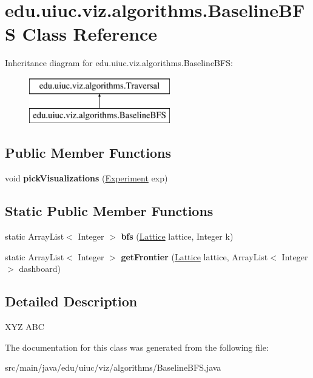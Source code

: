 \hypertarget{classedu_1_1uiuc_1_1viz_1_1algorithms_1_1_baseline_b_f_s}{}\section{edu.\+uiuc.\+viz.\+algorithms.\+Baseline\+B\+FS Class Reference}
\label{classedu_1_1uiuc_1_1viz_1_1algorithms_1_1_baseline_b_f_s}
Inheritance diagram for edu.\+uiuc.\+viz.\+algorithms.\+Baseline\+B\+FS\+:\begin{figure}[H]
\begin{center}
\leavevmode
\includegraphics[height=2.000000cm]{classedu_1_1uiuc_1_1viz_1_1algorithms_1_1_baseline_b_f_s}
\end{center}
\end{figure}
\subsection*{Public Member Functions}
\begin{DoxyCompactItemize}
\item 
\mbox{\label{classedu_1_1uiuc_1_1viz_1_1algorithms_1_1_baseline_b_f_s_a59b28e0e66bd0d1a56e2430fe99e880d}} 
void {\bfseries pick\+Visualizations} (\mbox{\hyperlink{classedu_1_1uiuc_1_1viz_1_1algorithms_1_1_experiment}{Experiment}} exp)
\end{DoxyCompactItemize}
\subsection*{Static Public Member Functions}
\begin{DoxyCompactItemize}
\item 
\mbox{\label{classedu_1_1uiuc_1_1viz_1_1algorithms_1_1_baseline_b_f_s_a918fbd71d194da92d8f5832af28a675d}} 
static Array\+List$<$ Integer $>$ {\bfseries bfs} (\mbox{\hyperlink{classedu_1_1uiuc_1_1viz_1_1lattice_1_1_lattice}{Lattice}} lattice, Integer k)
\item 
\mbox{\label{classedu_1_1uiuc_1_1viz_1_1algorithms_1_1_baseline_b_f_s_a1aa3a7d10160ab4d6a1e82150346da3d}} 
static Array\+List$<$ Integer $>$ {\bfseries get\+Frontier} (\mbox{\hyperlink{classedu_1_1uiuc_1_1viz_1_1lattice_1_1_lattice}{Lattice}} lattice, Array\+List$<$ Integer $>$ dashboard)
\end{DoxyCompactItemize}


\subsection{Detailed Description}
X\+YZ A\+BC 

The documentation for this class was generated from the following file\+:\begin{DoxyCompactItemize}
\item 
src/main/java/edu/uiuc/viz/algorithms/Baseline\+B\+F\+S.\+java\end{DoxyCompactItemize}
